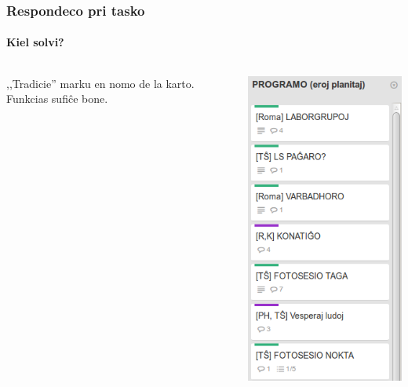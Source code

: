   \begin{frame}
    \frametitle{Respondeco pri tasko}
    \framesubtitle{Kiel solvi?}

    \begin{columns}
    	
    ,,Tradicie'' marku en nomo de la karto. Funkcias sufiĉe bone.
    	
    
    \includegraphics[scale=0.35]{ekranoj/respondeco-pri-karto}
	
	\end{columns}
  \end{frame}


%
%	    
